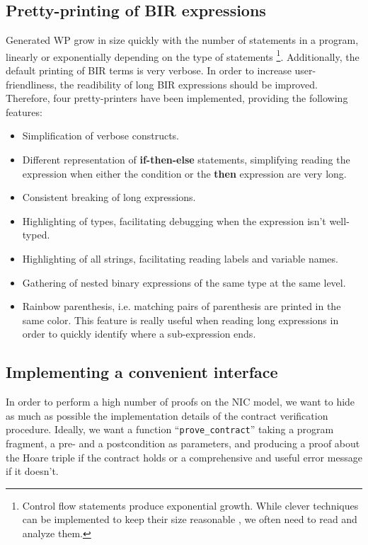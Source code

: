\documentclass[10pt,a4paper]{article}
\begin{document}
\begin{multicols}{2}
\subsection{Pretty-printing of BIR expressions} \label{pretty-printers}

Generated WP grow in size quickly with the number of statements in a program, linearly or exponentially depending on the type of statements \footnote{Control flow statements produce exponential growth. While clever techniques can be implemented to keep their size reasonable \cite{lindner_trabin:_2019}, we often need to read and analyze them.}. Additionally, the default printing of BIR terms is very verbose. In order to increase user-friendliness, the readibility of long BIR expressions should be improved. Therefore, four pretty-printers have been implemented, providing the following features:

\begin{itemize}
    \item Simplification of verbose constructs.
    \item Different representation of \textbf{if-then-else} statements, simplifying reading the expression when either the condition or the \textbf{then} expression are very long.
    \item Consistent breaking of long expressions.
    \item Highlighting of types, facilitating debugging when the expression isn't well-typed.
    \item Highlighting of all strings, facilitating reading labels and variable names.
    \item Gathering of nested binary expressions of the same type at the same level.
    \item Rainbow parenthesis, i.e. matching pairs of parenthesis are printed in the same color. This feature is really useful when reading long expressions in order to quickly identify where a sub-expression ends.
\end{itemize}

\subsection{Implementing a convenient interface} \label{impl_convenient_ht_interface}

In order to perform a high number of proofs on the {NIC} model, we want to hide as much as possible the implementation details of the contract verification procedure. Ideally, we want a function ``\texttt{prove\_contract}'' taking a program fragment, a pre- and a postcondition as parameters, and producing a proof about the Hoare triple if the contract holds or a comprehensive and useful error message if it doesn't.


\end{multicols}
\end{document}
